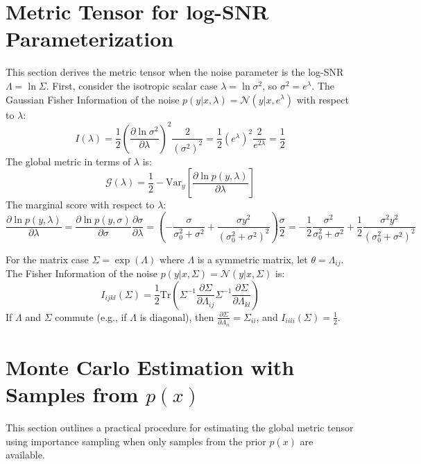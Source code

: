 \documentclass{article}
\begin{document}
\section{Metric Tensor for log-SNR Parameterization}
This section derives the metric tensor when the noise parameter is the log-SNR $\Lambda = \ln \Sigma$.
First, consider the isotropic scalar case $\lambda = \ln \sigma^2$, so $\sigma^2 = e^\lambda$.
The Gaussian Fisher Information of the noise $p(y|x, \lambda) = \mathcal{N}(y|x, e^\lambda)$ with respect to $\lambda$:
\begin{equation} \label{eq:1d_fisher_noise_log}
    I(\lambda) = \frac{1}{2} \left( \frac{\partial \ln \sigma^2}{\partial \lambda} \right)^2 \frac{2}{(\sigma^2)^2} = \frac{1}{2} (e^\lambda)^2 \frac{2}{e^{2\lambda}} = \frac{1}{2}
\end{equation}
The global metric in terms of $\lambda$ is:
\begin{equation} \label{eq:1d_metric_log}
    \mathcal{G}(\lambda) = \frac{1}{2} - \mathrm{Var}_y \left[ \frac{\partial \ln p(y, \lambda)}{\partial \lambda} \right]
\end{equation}
The marginal score with respect to $\lambda$:
\begin{equation} \label{eq:1d_score_log}
    \frac{\partial \ln p(y, \lambda)}{\partial \lambda} = \frac{\partial \ln p(y, \sigma)}{\partial \sigma} \frac{\partial \sigma}{\partial \lambda} = \left( -\frac{\sigma}{\sigma_0^2 + \sigma^2} + \frac{\sigma y^2}{(\sigma_0^2 + \sigma^2)^2} \right) \frac{\sigma}{2} = -\frac{1}{2} \frac{\sigma^2}{\sigma_0^2 + \sigma^2} + \frac{1}{2} \frac{\sigma^2 y^2}{(\sigma_0^2 + \sigma^2)^2}
\end{equation}

For the matrix case $\Sigma = \exp(\Lambda)$ where $\Lambda$ is a symmetric matrix, let $\theta = \Lambda_{ij}$. The Fisher Information of the noise $p(y|x, \Sigma) = \mathcal{N}(y|x, \Sigma)$ is:
\begin{equation} \label{eq:matrix_fisher_noise}
    I_{ijkl}(\Sigma) = \frac{1}{2} \mathrm{Tr} \left( \Sigma^{-1} \frac{\partial \Sigma}{\partial \Lambda_{ij}} \Sigma^{-1} \frac{\partial \Sigma}{\partial \Lambda_{kl}} \right)
\end{equation}
If $\Lambda$ and $\Sigma$ commute (e.g., if $\Lambda$ is diagonal), then $\frac{\partial \Sigma}{\partial \Lambda_{ii}} = \Sigma_{ii}$, and $I_{iiii}(\Sigma) = \frac{1}{2}$.

\section{Monte Carlo Estimation with Samples from $p(x)$}
This section outlines a practical procedure for estimating the global metric tensor using importance sampling when only samples from the prior $p(x)$ are available.
\end{document}
